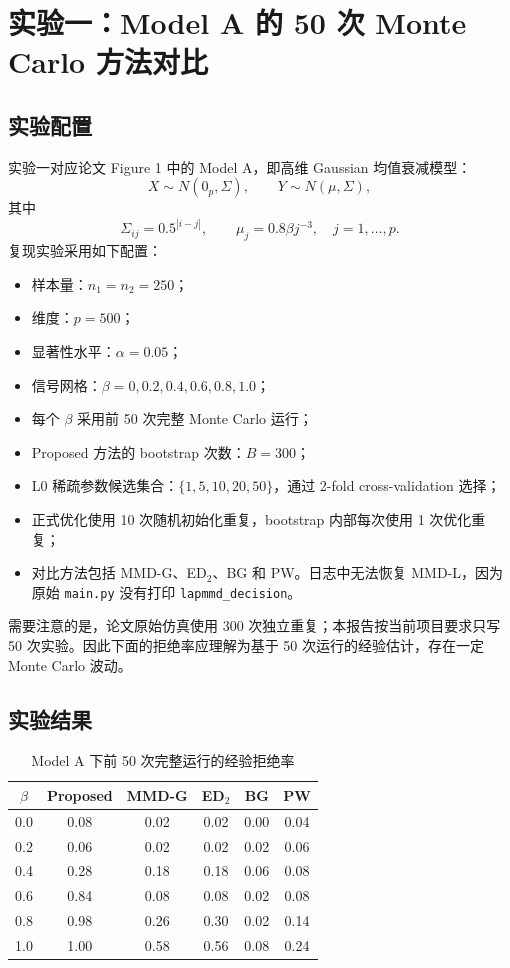 \documentclass[UTF8,a4paper,11pt]{ctexart}
\begin{document}
\section{实验一：Model A 的 50 次 Monte Carlo 方法对比}

\subsection{实验配置}

实验一对应论文 Figure 1 中的 Model A，即高维 Gaussian 均值衰减模型：
\[
X\sim N(0_p,\Sigma),\qquad Y\sim N(\mu,\Sigma),
\]
其中
\[
\Sigma_{ij}=0.5^{|i-j|},\qquad \mu_j=0.8\beta j^{-3},\quad j=1,\ldots,p.
\]
复现实验采用如下配置：

\begin{itemize}
  \item 样本量：\(n_1=n_2=250\)；
  \item 维度：\(p=500\)；
  \item 显著性水平：\(\alpha=0.05\)；
  \item 信号网格：\(\beta=0,0.2,0.4,0.6,0.8,1.0\)；
  \item 每个 \(\beta\) 采用前 50 次完整 Monte Carlo 运行；
  \item Proposed 方法的 bootstrap 次数：\(B=300\)；
  \item L0 稀疏参数候选集合：\(\{1,5,10,20,50\}\)，通过 2-fold cross-validation 选择；
  \item 正式优化使用 10 次随机初始化重复，bootstrap 内部每次使用 1 次优化重复；
  \item 对比方法包括 MMD-G、ED$_2$、BG 和 PW。日志中无法恢复 MMD-L，因为原始 \texttt{main.py} 没有打印 \texttt{lapmmd\_decision}。
\end{itemize}

需要注意的是，论文原始仿真使用 300 次独立重复；本报告按当前项目要求只写 50 次实验。因此下面的拒绝率应理解为基于 50 次运行的经验估计，存在一定 Monte Carlo 波动。

\subsection{实验结果}

\begin{table}[H]
\centering
\caption{Model A 下前 50 次完整运行的经验拒绝率}
\begin{tabular}{cccccc}
\toprule
\(\beta\) & Proposed & MMD-G & ED$_2$ & BG & PW \\
\midrule
0.0 & 0.08 & 0.02 & 0.02 & 0.00 & 0.04 \\
0.2 & 0.06 & 0.02 & 0.02 & 0.02 & 0.06 \\
0.4 & 0.28 & 0.18 & 0.18 & 0.06 & 0.08 \\
0.6 & 0.84 & 0.08 & 0.08 & 0.02 & 0.08 \\
0.8 & 0.98 & 0.26 & 0.30 & 0.02 & 0.14 \\
1.0 & 1.00 & 0.58 & 0.56 & 0.08 & 0.24 \\
\bottomrule
\end{tabular}
\end{table}
\end{document}
